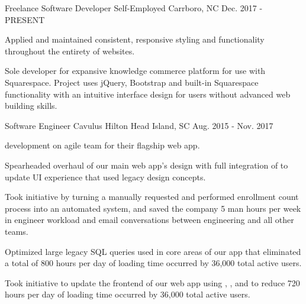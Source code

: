

\begin{cventries}

  \cventry
    {Freelance Software Developer} %
    {Self-Employed} %
    {Carrboro, NC} %
    {Dec. 2017 - PRESENT} %
    {
      \begin{cvitems} %
        \item {Applied and maintained consistent, responsive  styling and functionality throughout the entirety of  websites.}
        \item {Sole developer for expansive knowledge commerce platform for use with Squarespace. Project uses jQuery, Bootstrap and built-in Squarespace functionality with an intuitive interface design for users without advanced web building skills.}
      \end{cvitems}
    }

  \cventry
    {Software Engineer} %
    {Cavulus} %
    {Hilton Head Island, SC} %
    {Aug. 2015 - Nov. 2017} %
    {
      \begin{cvitems} %
        \item { development on agile team for their flagship web app.}
        \item {Spearheaded overhaul of our main web app's design with full integration of  to update UI experience that used legacy design concepts.}
        \item {Took initiative by turning a manually requested and performed enrollment count process into an automated system, and saved the company 5 man hours per week in engineer workload and email conversations between engineering and all other teams.}
        \item {Optimized large legacy SQL queries used in core areas of our app that eliminated a total of 800 hours per day of loading time occurred by 36,000 total active users.}
        \item {Took initiative to update the frontend of our web app using , , and  to reduce 720 hours per day of loading time occurred by 36,000 total active users.}
      \end{cvitems}
    }


\end{cventries}
